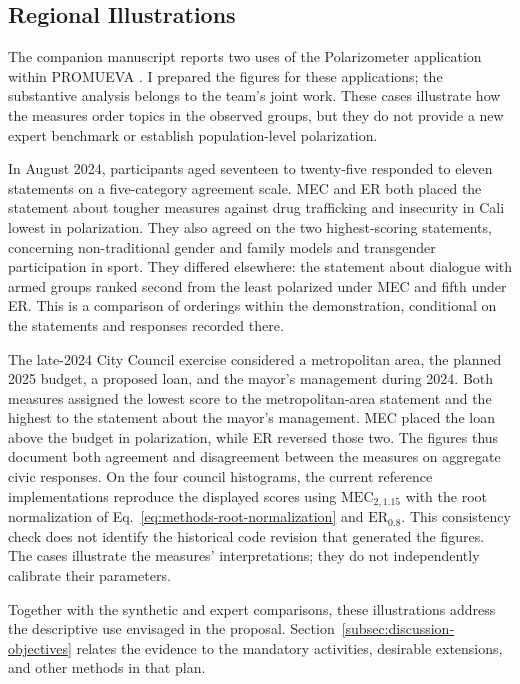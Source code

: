 \documentclass{article}
\theoremstyle{plain}
\theoremstyle{remark}
\begin{document}
\subsection{Regional Illustrations}\label{subsec:results-regional}

The companion manuscript reports two uses of the Polarizometer application within PROMUEVA \citep[Section~12]{arandaMECcompanion}. I prepared the figures for these applications; the substantive analysis belongs to the team's joint work. These cases illustrate how the measures order topics in the observed groups, but they do not provide a new expert benchmark or establish population-level polarization.

In August 2024, participants aged seventeen to twenty-five responded to eleven statements on a five-category agreement scale. MEC and ER both placed the statement about tougher measures against drug trafficking and insecurity in Cali lowest in polarization. They also agreed on the two highest-scoring statements, concerning non-traditional gender and family models and transgender participation in sport. They differed elsewhere: the statement about dialogue with armed groups ranked second from the least polarized under MEC and fifth under ER. This is a comparison of orderings within the demonstration, conditional on the statements and responses recorded there.

The late-2024 City Council exercise considered a metropolitan area, the planned 2025 budget, a proposed loan, and the mayor's management during 2024. Both measures assigned the lowest score to the metropolitan-area statement and the highest to the statement about the mayor's management. MEC placed the loan above the budget in polarization, while ER reversed those two. The figures thus document both agreement and disagreement between the measures on aggregate civic responses. On the four council histograms, the current reference implementations reproduce the displayed scores using $\mathrm{MEC}_{2,1.15}$ with the root normalization of Eq.~\eqref{eq:methods-root-normalization} and $\mathrm{ER}_{0.8}$. This consistency check does not identify the historical code revision that generated the figures. The cases illustrate the measures' interpretations; they do not independently calibrate their parameters.

Together with the synthetic and expert comparisons, these illustrations address the descriptive use envisaged in the proposal. Section~\ref{subsec:discussion-objectives} relates the evidence to the mandatory activities, desirable extensions, and other methods in that plan.
\end{document}
